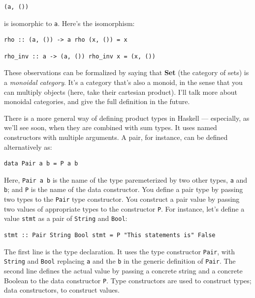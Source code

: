 \begin{verbatim}
(a, ())
\end{verbatim}

is isomorphic to \texttt{a}. Here's the isomorphism:

\begin{verbatim}
rho :: (a, ()) -> a rho (x, ()) = x
\end{verbatim}

\begin{verbatim}
rho_inv :: a -> (a, ()) rho_inv x = (x, ())
\end{verbatim}

These observations can be formalized by saying that \textbf{Set} (the
category of sets) is a \emph{monoidal category}. It's a category that's
also a monoid, in the sense that you can multiply objects (here, take
their cartesian product). I'll talk more about monoidal categories, and
give the full definition in the future.

There is a more general way of defining product types in Haskell ---
especially, as we'll see soon, when they are combined with sum types. It
uses named constructors with multiple arguments. A pair, for instance,
can be defined alternatively as:

\begin{verbatim}
data Pair a b = P a b
\end{verbatim}

Here, \texttt{Pair\ a\ b} is the name of the type paremeterized by two
other types, \texttt{a} and \texttt{b}; and \texttt{P} is the name of
the data constructor. You define a pair type by passing two types to the
\texttt{Pair} type constructor. You construct a pair value by passing
two values of appropriate types to the constructor \texttt{P}. For
instance, let's define a value \texttt{stmt} as a pair of
\texttt{String} and \texttt{Bool}:

\begin{verbatim}
stmt :: Pair String Bool stmt = P "This statements is" False
\end{verbatim}

The first line is the type declaration. It uses the type constructor
\texttt{Pair}, with \texttt{String} and \texttt{Bool} replacing
\texttt{a} and the \texttt{b} in the generic definition of
\texttt{Pair}. The second line defines the actual value by passing a
concrete string and a concrete Boolean to the data constructor
\texttt{P}. Type constructors are used to construct types; data
constructors, to construct values.

